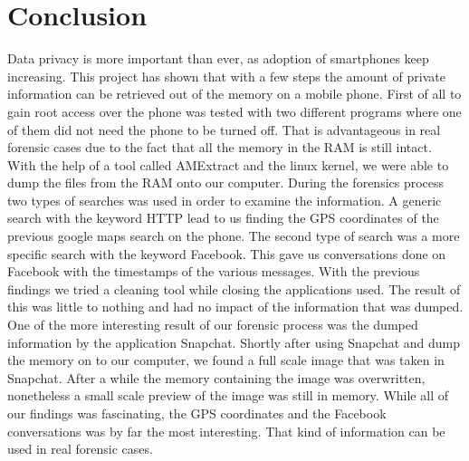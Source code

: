 \section{Conclusion}
Data privacy is more important than ever, as adoption of smartphones keep increasing. This project has shown that with a few steps the amount of private information can be retrieved out of the memory on a mobile phone. First of all to gain root access over the phone was tested with two different programs where one of them did not need the phone to be turned off. That is advantageous in real forensic cases due to the fact that all the memory in the RAM is still intact. With the help of a tool called AMExtract and the linux kernel, we were able to dump the files from the RAM onto our computer. During the forensics process two types of searches was used in order to examine the information. A generic search with the keyword HTTP lead to us finding the GPS coordinates of the previous google maps search on the phone. The second type of search was a more specific search with the keyword Facebook. This gave us conversations done on Facebook with the timestamps of the various messages. With the previous findings we tried a cleaning tool while closing the applications used. The result of this was little to nothing and had no impact of the information that was dumped. One of the more interesting result of our forensic process was the dumped information by the application Snapchat. Shortly after using Snapchat and dump the memory on to our computer, we found a full scale image that was taken in Snapchat. After a while the memory containing the image was overwritten, nonetheless a small scale preview of the image was still in memory. While all of our findings was fascinating, the GPS coordinates and the Facebook conversations was by far the most interesting. That kind of information can be used in real forensic cases.